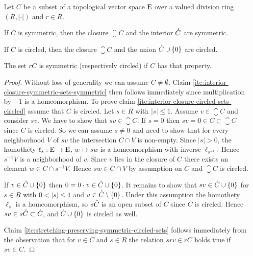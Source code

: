 \begin{lemma}
\label{thm:closure-interior-circled-set-circled}
  Let $C$ be a subset of a topological vector space $\mathrm{E}$ over a
  valued division ring $(R,|\cdot|)$ and $r\in R$.
  \begin{romanlist}
  \item\label{ite:interior-closure-symmetric-sets-symmetric}  
    If $C$ is symmetric, then the closure $\closure{C}$ and the interior $\mathring{C}$ are symmetric.  
  \item\label{ite:interior-closure-circled-sets-circled}    
    If $C$ is circled, then the closure $\closure{C}$ and  the union $\mathring{C} \cup\{0\}$ are circled.
  \item\label{ite:stretching-preserving-symmetric-circled-sets}  
    The set $rC$ is symmetric (respectively circled) if $C$ has that property.  
  \end{romanlist}
\end{lemma}

\begin{proof}
  Without loss of generality we can assume $C \neq \emptyset$.
  Claim \ref{ite:interior-closure-symmetric-sets-symmetric} then follows immediately since multiplication
  by $-1$ is a homeomorphism. 
  To prove  claim \ref{ite:interior-closure-circled-sets-circled} assume that $C$ is circled. 
  Let $s\in R$ with $|s|\leq 1$. Assume $v \in \closure{C}$ and consider $sv$. We have to show
  that $sv \in \closure{C}$. If $s=0$ then $sv =0\in C \subset \closure{C}$ since $C$ is circled.
  So we can assume $s\neq 0$ and need to show that for every neighborhood $V$ of $sv$ the intersection
  $C\cap V$ is non-empty. Since $|s|>0$, the homothety $\ell_s:\mathrm{E}\to \mathrm{E}$, $w\mapsto sw$ is a
  homeomorphism with inverse
  $\ell_{s^{-1}}$. Hence $s^{-1}V$ is a neighborhood of $v$. Since $v$ lies in the closure of $C$ 
  there exists an element $w\in C\cap s^{-1}V$. Hence $sw \in C \cap V$ by assumption on $C$
  and $\closure{C}$ is circled.

  If $v \in \mathring{C}\cup\{0\}$ then $0 = 0 \cdot v \in \mathring{C}\cup\{0\}$. It remains to show that
  $sv \in \mathring{C}\cup\{0\}$ for $s\in R$ with $0 < |s|\leq 1$ and $v \in \mathring{C} \setminus \{ 0\}$.
  Under this assumption the homothety $\ell_s$ is a homeomorphism, so $s \mathring{C}$ is an open subset
  of $C$ since $C$ is circled. Hence $s v \in s \mathring{C} \subset \mathring{C}$, and  $\mathring{C}\cup\{0\}$
  is circled as well.

  Claim \ref{ite:stretching-preserving-symmetric-circled-sets} follows immediately from the observation that
  for  $v\in C$ and $s\in R$ the relation $srv \in rC$ holds true if $sv \in C$. 
\end{proof}

